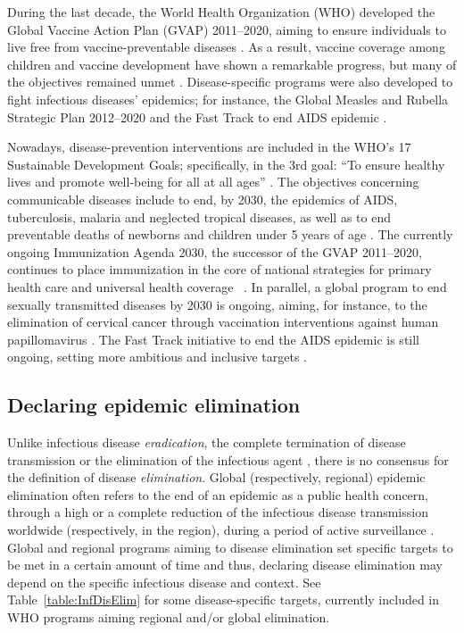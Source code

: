 During the last decade, the World Health Organization (WHO) developed the Global Vaccine Action Plan (GVAP) 2011--2020, aiming to ensure individuals to live free from vaccine-preventable diseases \cite[]{GVAP_Review2020}. As a result, vaccine coverage among children and vaccine development have shown a remarkable progress, but many of the objectives remained unmet \cite[]{GVAP_Review2020}. Disease-specific programs were also developed to fight infectious diseases' epidemics; for instance, the Global Measles and Rubella Strategic Plan 2012--2020 \cite[]{WHO_MR2012} and the Fast Track to end AIDS epidemic \cite[]{UNAIDS_EndAIDS2011}. 


Nowadays, disease-prevention interventions are included in the WHO's 17 Sustainable Development Goals; specifically, in the 3rd goal: ``To ensure healthy lives and promote well-being for all at all ages'' \cite[]{SDG_Goal3}. The objectives concerning communicable diseases include to end, by 2030, the epidemics of AIDS, tuberculosis, malaria and neglected tropical diseases, as well as to end preventable deaths of newborns and children under 5 years of age \cite[]{SDG_Goal3}. The currently ongoing Immunization Agenda 2030, the successor of the GVAP 2011--2020, continues to place immunization in the core of national strategies for primary health care and universal health coverage~ \cite[]{WHO_IA2030}. In parallel, a global program to end sexually transmitted diseases by 2030 is ongoing, aiming, for instance, to the elimination of cervical cancer through vaccination interventions against human papillomavirus \cite[]{WHO_STIs}. The Fast Track initiative to end the AIDS
epidemic is still ongoing, setting more ambitious and inclusive targets \cite[]{UNAIDS_EndAIDS2030}. 


\subsection{Declaring epidemic elimination}  \label{Intro:EpiElim}

Unlike infectious disease \emph{eradication}, the complete termination of disease transmission or the elimination of the infectious agent \cite[]{Porta2014}, there is no consensus for the definition of disease \emph{elimination}. Global (respectively, regional) epidemic elimination often refers to the end of an epidemic as a public health concern, through a high or a complete reduction of the infectious disease transmission worldwide (respectively, in the region), during a period of active surveillance \cite[]{Porta2014,Nishiura2016}. Global and regional programs aiming to disease elimination set specific targets to be met in a certain amount of time and thus, declaring disease elimination may depend on the specific infectious disease and context. See Table~\ref{table:InfDisElim} for some disease-specific targets, currently included in WHO programs aiming regional and/or global elimination.

